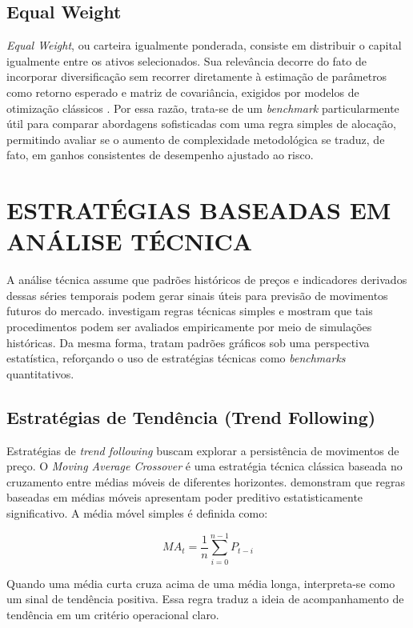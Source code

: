 \documentclass{eic-bcc-tcc}
\begin{document}
\subsection{Equal Weight}
\textit{Equal Weight}, ou carteira igualmente ponderada, consiste em distribuir o capital igualmente entre os ativos selecionados. Sua relevância decorre do fato de incorporar diversificação sem recorrer diretamente à estimação de parâmetros como retorno esperado e matriz de covariância, exigidos por modelos de otimização clássicos \citep{Markowitz1952, Clarke2006, DeMiguel2009}. Por essa razão, trata-se de um \textit{benchmark} particularmente útil para comparar abordagens sofisticadas com uma regra simples de alocação, permitindo avaliar se o aumento de complexidade metodológica se traduz, de fato, em ganhos consistentes de desempenho ajustado ao risco.

\section{ESTRATÉGIAS BASEADAS EM ANÁLISE TÉCNICA}

A análise técnica assume que padrões históricos de preços e indicadores derivados dessas séries temporais podem gerar sinais úteis para previsão de movimentos futuros do mercado. \citet{Brock1992} investigam regras técnicas simples e mostram que tais procedimentos podem ser avaliados empiricamente por meio de simulações históricas. Da mesma forma, \citet{Lo2000} tratam padrões gráficos sob uma perspectiva estatística, reforçando o uso de estratégias técnicas como \textit{benchmarks} quantitativos.

\subsection{Estratégias de Tendência (Trend Following)}

Estratégias de \textit{trend following} buscam explorar a persistência de movimentos de preço. O \textit{Moving Average Crossover} é uma estratégia técnica clássica baseada no cruzamento entre médias móveis de diferentes horizontes. \citet{Brock1992} demonstram que regras baseadas em médias móveis apresentam poder preditivo estatisticamente significativo. A média móvel simples é definida como:

\begin{equation}
MA_t = \frac{1}{n} \sum_{i=0}^{n-1} P_{t-i}
\end{equation}

Quando uma média curta cruza acima de uma média longa, interpreta-se como um sinal de tendência positiva. Essa regra traduz a ideia de acompanhamento de tendência em um critério operacional claro.
\end{document}
